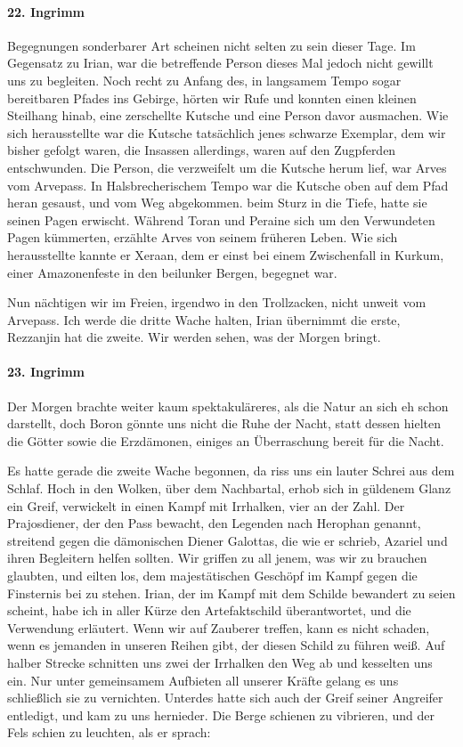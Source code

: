 \paragraph{22. Ingrimm}
Begegnungen sonderbarer Art scheinen nicht selten zu sein dieser Tage. Im Gegensatz zu Irian, war die betreffende Person dieses Mal jedoch nicht gewillt uns zu begleiten.
Noch recht zu Anfang des, in langsamem Tempo sogar bereitbaren Pfades ins Gebirge, hörten wir Rufe und konnten einen kleinen Steilhang hinab, eine zerschellte Kutsche und eine Person davor ausmachen. Wie sich herausstellte war die Kutsche tatsächlich jenes schwarze Exemplar, dem wir bisher gefolgt waren, die Insassen allerdings, waren auf den Zugpferden entschwunden. Die Person, die verzweifelt um die Kutsche herum lief, war Arves vom Arvepass. In Halsbrecherischem Tempo war die Kutsche oben auf dem Pfad heran gesaust, und vom Weg abgekommen. beim Sturz in die Tiefe, hatte sie seinen Pagen erwischt. Während Toran und Peraine sich um den Verwundeten Pagen kümmerten, erzählte Arves von seinem früheren Leben. Wie sich herausstellte kannte er Xeraan, dem er einst bei einem Zwischenfall in Kurkum, einer Amazonenfeste in den beilunker Bergen, begegnet war.

Nun nächtigen wir im Freien, irgendwo in den Trollzacken, nicht unweit vom Arvepass. Ich werde die dritte Wache halten, Irian übernimmt die erste, Rezzanjin hat die zweite. Wir werden sehen, was der Morgen bringt.

\paragraph{23. Ingrimm}
Der Morgen brachte weiter kaum spektakuläreres, als die Natur an sich eh schon darstellt, doch Boron gönnte uns nicht die Ruhe der Nacht, statt dessen hielten die Götter sowie die Erzdämonen, einiges an Überraschung bereit für die Nacht.

Es hatte gerade die zweite Wache begonnen, da riss uns ein lauter Schrei aus dem Schlaf. Hoch in den Wolken, über dem Nachbartal, erhob sich in güldenem Glanz ein Greif, verwickelt in einen Kampf mit Irrhalken, vier an der Zahl. Der Prajosdiener, der den Pass bewacht, den Legenden nach Herophan genannt, streitend gegen die dämonischen Diener Galottas, die wie er schrieb, Azariel und ihren Begleitern helfen sollten. Wir griffen zu all jenem, was wir zu brauchen glaubten, und eilten los, dem majestätischen Geschöpf im Kampf gegen die Finsternis bei zu stehen. Irian, der im Kampf mit dem Schilde bewandert zu seien scheint, habe ich in aller Kürze den Artefaktschild überantwortet, und die Verwendung erläutert. Wenn wir auf Zauberer treffen, kann es nicht schaden, wenn es jemanden in unseren Reihen gibt, der diesen Schild zu führen weiß. Auf halber Strecke schnitten uns zwei der Irrhalken den Weg ab und kesselten uns ein. Nur unter gemeinsamem Aufbieten all unserer Kräfte gelang es uns schließlich sie zu vernichten. Unterdes hatte sich auch der Greif seiner Angreifer entledigt, und kam zu uns hernieder. Die Berge schienen zu vibrieren, und der Fels schien zu leuchten, als er sprach:

